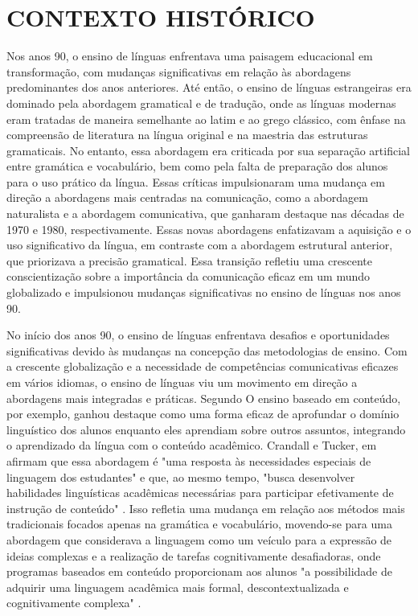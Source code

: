 \section{CONTEXTO HISTÓRICO}

Nos anos 90, o ensino de línguas enfrentava uma paisagem educacional em transformação, com mudanças significativas em relação às abordagens predominantes dos anos anteriores. Até então, o ensino de línguas estrangeiras era dominado pela abordagem gramatical e de tradução, onde as línguas modernas eram tratadas de maneira semelhante ao latim e ao grego clássico, com ênfase na compreensão de literatura na língua original e na maestria das estruturas gramaticais. No entanto, essa abordagem era criticada por sua separação artificial entre gramática e vocabulário, bem como pela falta de preparação dos alunos para o uso prático da língua. Essas críticas impulsionaram uma mudança em direção a abordagens mais centradas na comunicação, como a abordagem naturalista e a abordagem comunicativa, que ganharam destaque nas décadas de 1970 e 1980, respectivamente. Essas novas abordagens enfatizavam a aquisição e o uso significativo da língua, em contraste com a abordagem estrutural anterior, que priorizava a precisão gramatical. Essa transição refletiu uma crescente conscientização sobre a importância da comunicação eficaz em um mundo globalizado e impulsionou mudanças significativas no ensino de línguas nos anos 90.

No início dos anos 90, o ensino de línguas enfrentava desafios e oportunidades significativas devido às mudanças na concepção das metodologias de ensino. Com a crescente globalização e a necessidade de competências comunicativas eficazes em vários idiomas, o ensino de línguas viu um movimento em direção a abordagens mais integradas e práticas. Segundo  O ensino baseado em conteúdo, por exemplo, ganhou destaque como uma forma eficaz de aprofundar o domínio linguístico dos alunos enquanto eles aprendiam sobre outros assuntos, integrando o aprendizado da língua com o conteúdo acadêmico.  Crandall e Tucker, em  afirmam que essa abordagem é "uma resposta às necessidades especiais de linguagem dos estudantes" \cite[p. 83]{anivan1990} e que, ao mesmo tempo, "busca desenvolver habilidades linguísticas acadêmicas necessárias para participar efetivamente de instrução de conteúdo​​" \cite[p. 84]{anivan1990}. Isso refletia uma mudança em relação aos métodos mais tradicionais focados apenas na gramática e vocabulário, movendo-se para uma abordagem que considerava a linguagem como um veículo para a expressão de ideias complexas e a realização de tarefas cognitivamente desafiadoras, onde programas baseados em conteúdo proporcionam aos alunos "a possibilidade de adquirir uma linguagem acadêmica mais formal, descontextualizada e cognitivamente complexa" \cite[p. 84]{anivan1990}.



